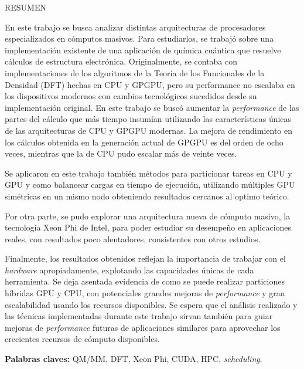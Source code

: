 \begin{center}
\large \textsc{RESUMEN}
\end{center}
\vspace{1cm}

\noindent

En este trabajo se busca analizar distintas arquitecturas de procesadores especializados
en c\'omputos masivos. Para estudiarlos, se trabaj\'o sobre una implementaci\'on existente
de una aplicaci\'on de qu\'imica cu\'antica que resuelve c\'alculos de estructura electr\'onica.
Originalmente, se contaba con implementaciones de los algoritmos de la Teor\'ia de los
Funcionales de la Densidad (DFT) hechas en CPU y GPGPU, pero su performance no escalaba en los
dispositivos modernos con cambios tecnol\'ogicos sucedidos desde su implementaci\'on original.
En este trabajo se busc\'o
aumentar la \textit{performance} de las partes del c\'alculo que m\'as tiempo insum\'ian utilizando
las caracter\'isticas \'unicas de las arquitecturas de CPU y GPGPU modernas. La mejora de
rendimiento en los c\'alculos obtenida en la generaci\'on actual de GPGPU es del orden de ocho
veces, mientras que la de CPU pudo escalar m\'as de veinte veces.

Se aplicaron en este trabajo tambi\'en m\'etodos para particionar tareas en CPU y GPU y como
balancear cargas en tiempo de ejecuci\'on, utilizando m\'ultiples GPU sim\'etricas en un mismo nodo
obteniendo resultados cercanos al optimo te\'orico.

Por otra parte, se pudo explorar una arquitectura nueva de c\'omputo masivo, la
tecnolog\'ia Xeon Phi de Intel, para poder estudiar su desempe\~no en aplicaciones reales, con
resultados poco alentadores, consistentes con otros estudios.

Finalmente, los resultados obtenidos reflejan la importancia de trabajar con el \textit{hardware}
apropiadamente, explotando las capacidades \'unicas de cada herramienta. Se deja asentada evidencia
de como se puede realizar particiones h\'ibridas GPU y CPU, con potenciales grandes mejoras
de \textit{performance} y gran escalabilidad usando los recursos disponibles. Se espera que el an\'alisis
realizado y las t\'ecnicas implementadas durante este trabajo sirvan tambi\'en para guiar mejoras
de \textit{performance} futuras de aplicaciones similares para aprovechar los crecientes recursos de c\'omputo
disponibles.

\bigskip

\noindent\textbf{Palabras claves:} QM/MM, DFT, Xeon Phi, CUDA, HPC, \textit{scheduling}.

